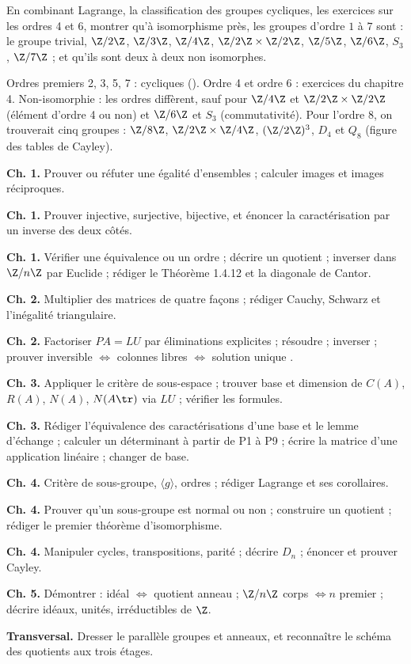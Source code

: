 \begin{exo}
En combinant Lagrange, la classification des groupes cycliques, les exercices sur les ordres 4 et 6, montrer qu'à isomorphisme près, les groupes d'ordre $1$ à $7$ sont : le groupe trivial, $\Z/2\Z$, $\Z/3\Z$, $\Z/4\Z$, $\Z/2\Z\times\Z/2\Z$, $\Z/5\Z$, $\Z/6\Z$, $S_3$, $\Z/7\Z$ ; et qu'ils sont deux à deux non isomorphes.
\begin{corrige}
Ordres premiers 2, 3, 5, 7 : cycliques (). Ordre 4 et ordre 6 : exercices du chapitre 4. Non-isomorphie : les ordres diffèrent, sauf pour $\Z/4\Z$ et $\Z/2\Z\times\Z/2\Z$ (élément d'ordre 4 ou non) et $\Z/6\Z$ et $S_3$ (commutativité). Pour l'ordre 8, on trouverait cinq groupes : $\Z/8\Z$, $\Z/2\Z\times\Z/4\Z$, $(\Z/2\Z)^3$, $D_4$ et $Q_8$ (figure des tables de Cayley).
\end{corrige}
\end{exo}

\begin{bilan}
\item \textbf{Ch. 1.} Prouver ou réfuter une égalité d'ensembles ; calculer images et images réciproques.
\item \textbf{Ch. 1.} Prouver injective, surjective, bijective, et énoncer la caractérisation par un inverse des deux côtés.
\item \textbf{Ch. 1.} Vérifier une équivalence ou un ordre ; décrire un quotient ; inverser dans $\Z/n\Z$ par Euclide ; rédiger le Théorème 1.4.12 et la diagonale de Cantor.
\item \textbf{Ch. 2.} Multiplier des matrices de quatre façons ; rédiger Cauchy, Schwarz et l'inégalité triangulaire.
\item \textbf{Ch. 2.} Factoriser $PA=LU$ par éliminations explicites ; résoudre ; inverser ; prouver \og inversible $\iff$ colonnes libres $\iff$ solution unique \fg.
\item \textbf{Ch. 3.} Appliquer le critère de sous-espace ; trouver base et dimension de $C(A)$, $R(A)$, $N(A)$, $N(A\tr)$ via $LU$ ; vérifier les formules.
\item \textbf{Ch. 3.} Rédiger l'équivalence des caractérisations d'une base et le lemme d'échange ; calculer un déterminant à partir de P1 à P9 ; écrire la matrice d'une application linéaire ; changer de base.
\item \textbf{Ch. 4.} Critère de sous-groupe, $\langle g\rangle$, ordres ; rédiger Lagrange et ses corollaires.
\item \textbf{Ch. 4.} Prouver qu'un sous-groupe est normal ou non ; construire un quotient ; rédiger le premier théorème d'isomorphisme.
\item \textbf{Ch. 4.} Manipuler cycles, transpositions, parité ; décrire $D_n$ ; énoncer et prouver Cayley.
\item \textbf{Ch. 5.} Démontrer : idéal $\iff$ quotient anneau ; $\Z/n\Z$ corps $\iff n$ premier ; décrire idéaux, unités, irréductibles de $\Z$.
\item \textbf{Transversal.} Dresser le parallèle groupes et anneaux, et reconnaître le schéma des quotients aux trois étages.
\end{bilan}
